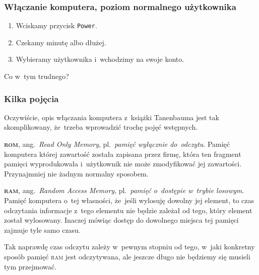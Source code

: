 \documentclass[10pt,t]{beamer}
\begin{document}
\begin{frame}
  \frametitle{Włączanie komputera, poziom normalnego użytkownika}


  \begin{enumerate}

  \item Wciskamy przycisk \texttt{Power}.



  \item Czekamy minutę albo dłużej.



  \item Wybieramy użytkownika i~wchodzimy na swoje konto.

  \end{enumerate}

  Co w~tym trudnego?

\end{frame}





\begin{frame}
  \frametitle{Kilka pojęcia}


  Oczywiście, opis włączania komputera z~książki Tanenbauma jest tak
  skomplikowany, że~trzeba wprowadzić trochę pojęć wstępnych.

  \textbf{\textsc{rom}}, ang.~\textit{Read Only Memory}, pl.~\textit{pamięć
    wyłącznie do~odczytu}. Pamięć komputera której zawartość została
  zapisana przez firmę, która ten fragment pamięci wyprodukowała
  i~użytkownik nie może zmodyfikować jej zawartości. Przynajmniej nie żadnym
  normalny sposobem.

  \textbf{\textsc{ram}}, ang.~\textit{Random Access Memory},
  pl.~\textit{pamięć o~dostępie w~trybie losowym}. Pamięć komputera o~tej
  własności, że~jeśli wylosuję dowolny jej element, to czas odczytania
  informacje z~tego elementu nie będzie zależał od tego, który element
  został wylosowany. Inaczej mówiąc dostęp do dowolnego miejsca tej pamięci
  zajmuje tyle samo czasu.

  Tak naprawdę czas odczytu zależy w~pewnym stopniu od tego, w~jaki
  konkretny sposób pamięć \textsc{ram} jest odczytywana, ale jeszcze długo
  nie będziemy się musieli tym przejmować.

\end{frame}
\end{document}
